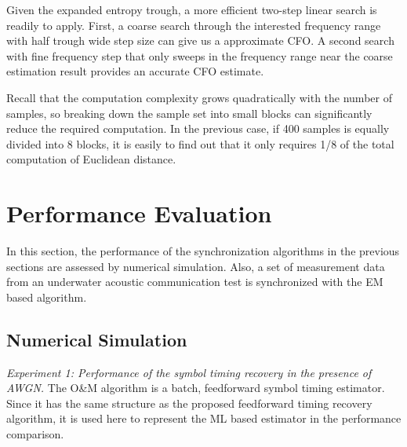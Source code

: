 \documentclass[journal,comsoc]{IEEEtran}
\begin{document}
Given the expanded entropy trough, a more efficient two-step linear search is readily to apply.
First, a coarse search through the interested frequency range with half trough wide step size can give us a approximate CFO.
A second search with fine frequency step that only sweeps in the frequency range near the coarse estimation result provides an accurate CFO estimate.

Recall that the computation complexity grows quadratically with the number of samples, so breaking down the sample set into small blocks can significantly reduce the required computation.
In the previous case, if 400 samples is equally divided into 8 blocks, it is easily to find out that it only requires 1/8 of the total computation of Euclidean distance. 




\section{Performance Evaluation}
\label{sec:performance}
In this section, the performance of the synchronization algorithms in the previous sections are assessed by numerical simulation.
Also, a set of measurement data from an underwater acoustic communication test is synchronized with the EM based algorithm.

\subsection{Numerical Simulation}
\textit{Experiment 1:
Performance of the symbol timing recovery in the presence of AWGN.}
The O\&M algorithm is a batch, feedforward symbol timing estimator.
Since it has the same structure as the proposed feedforward timing recovery algorithm, it is used here to represent the ML based estimator in the performance comparison.
\end{document}
